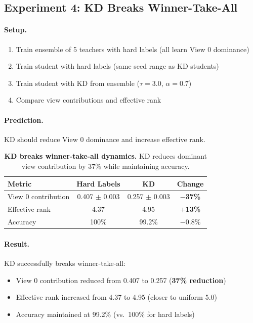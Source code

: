 \documentclass{article}
\begin{document}
\subsection{Experiment 4: KD Breaks Winner-Take-All}

\paragraph{Setup.}
\begin{enumerate}
    \item Train ensemble of 5 teachers with hard labels (all learn View 0 dominance)
    \item Train student with hard labels (same seed range as KD students)
    \item Train student with KD from ensemble ($\tau=3.0$, $\alpha=0.7$)
    \item Compare view contributions and effective rank
\end{enumerate}

\paragraph{Prediction.} KD should reduce View 0 dominance and increase effective rank.

\begin{table}[h]
\centering
\caption{\textbf{KD breaks winner-take-all dynamics.} KD reduces dominant view contribution by 37\% while maintaining accuracy.}
\label{tab:kd}
\begin{tabular}{@{}lccc@{}}
\toprule
Metric & Hard Labels & KD & Change \\
\midrule
View 0 contribution & 0.407 $\pm$ 0.003 & 0.257 $\pm$ 0.003 & \textbf{$-$37\%} \\
Effective rank & 4.37 & 4.95 & \textbf{$+$13\%} \\
Accuracy & 100\% & 99.2\% & $-$0.8\% \\
\bottomrule
\end{tabular}
\end{table}

\paragraph{Result.} KD successfully breaks winner-take-all:
\begin{itemize}
    \item View 0 contribution reduced from 0.407 to 0.257 (\textbf{37\% reduction})
    \item Effective rank increased from 4.37 to 4.95 (closer to uniform 5.0)
    \item Accuracy maintained at 99.2\% (vs.\ 100\% for hard labels)
\end{itemize}
\end{document}
